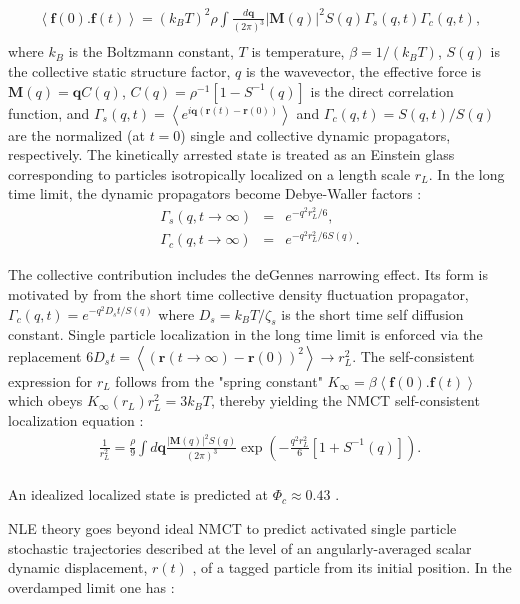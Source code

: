 \documentclass[twocolumn,showpacs,preprintnumbers,amsmath,amssymb,unsortedaddress,
]{revtex4-1}
\begin{document}
\begin{eqnarray}
\left\langle \mathbf{f}(0).\mathbf{f}(t) \right\rangle = (k_BT)^2\rho\int\frac{d\mathbf{q}}{(2\pi)^3}\left|\mathbf{M}(q)\right|^2S(q)\Gamma_s(q,t)\Gamma_c(q,t),\nonumber\\
\end{eqnarray}
where $k_B$ is the Boltzmann  constant, $T$ is temperature, $\beta = 1/(k_BT)$, $S(q)$ is the collective static structure factor, $q$ is the wavevector, the effective force is $\mathbf{M}(q)=\mathbf{q}C(q)$,  $C(q)=\rho^{-1}\left[1-S^{-1}(q) \right]$ is the direct correlation function, and $\Gamma_s(q,t)= \left< e^{i\mathbf{q}\left(\mathbf{r}(t)-\mathbf{r}(0) \right)} \right>$ and $\Gamma_c(q,t)=S(q,t)/S(q)$ are the normalized (at $t=0$) single and collective dynamic propagators, respectively. The kinetically arrested state is treated as an Einstein glass corresponding to particles isotropically localized on a length scale $r_L$. In the long time limit, the dynamic propagators become Debye-Waller factors \cite{10,33}:
\begin{eqnarray}
\Gamma_s(q,t\rightarrow \infty) &=& e^{-q^2r_L^2/6}, \nonumber\\
\Gamma_c(q,t\rightarrow \infty) &=& e^{-q^2r_L^2/6S(q)}.
\end{eqnarray}

The collective contribution includes the deGennes narrowing effect. Its form is motivated by from the short time collective density fluctuation propagator, $\Gamma_c(q,t) = e^{-q^2D_st/S(q)}$ where $D_s = k_BT/\zeta_s$ is the short time self diffusion constant. Single particle localization in the long time limit is enforced via the replacement $6D_st = \left\langle (\mathbf{r}(t\rightarrow \infty)-\mathbf{r}(0))^2\right\rangle \rightarrow r_{L}^2$. The self-consistent expression for $r_L$ follows from the "spring constant" $K_\infty = \beta\left\langle \mathbf{f}(0).\mathbf{f}(t) \right\rangle$ which obeys $K_\infty(r_L)r_L^2=3k_BT$, thereby yielding the NMCT self-consistent localization equation \cite{33}:
\begin{eqnarray}
\frac{1}{r_L^2} = \frac{\rho}{9}\int d\mathbf{q} \frac{\left|\mathbf{M}(q)\right|^2S(q)}{\left(2\pi \right)^3}\exp\left(-\frac{q^2r_L^2}{6}\left[1+S^{-1}(q) \right] \right).\nonumber\\
\label{eq:local}
\end{eqnarray}

An idealized localized state is predicted at $\Phi_c \approx 0.43$ \cite{33}.

NLE theory goes beyond ideal NMCT to predict activated single particle stochastic trajectories described at the level of an angularly-averaged scalar dynamic displacement, $r(t)$ , of a tagged particle from its initial position. In the overdamped limit one has \cite{10,33}:
\end{document}
